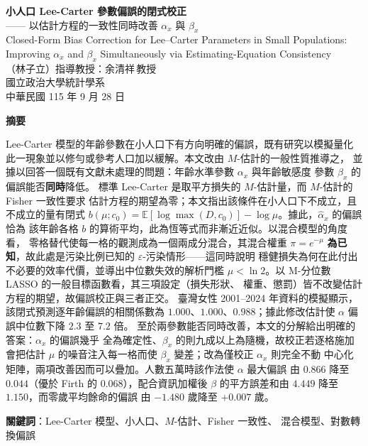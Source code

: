 \documentclass[UTF8, fontset=macnew, a4paper, 12pt]{ctexart}
\newcommand{\Ex}{\mathbb{E}}
\begin{document}
\begin{center}
{\bfseries 小人口 Lee-Carter 參數偏誤的閉式校正}\\[4pt]
{ —— 以估計方程的一致性同時改善 $\alpha_x$ 與 $\beta_x$}\\[6pt]
{ Closed-Form Bias Correction for Lee--Carter Parameters in Small
Populations:}\\[2pt]
{ Improving $\alpha_x$ and $\beta_x$ Simultaneously via
Estimating-Equation Consistency}\\[12pt]
{ （林子立）\quad 指導教授：余清祥\,教授}\\[4pt]
{ 國立政治大學統計學系}\\[4pt]
{ 中華民國 115 年 9 月 28 日}
\end{center}

\vspace{6pt}
\begin{center}
\begin{minipage}{0.92\textwidth}
\small
\textbf{摘要}\par\vspace{4pt}
Lee-Carter 模型的年齡參數在小人口下有方向明確的偏誤，既有研究以模擬量化
此一現象並以修勻或參考人口加以緩解。本文改由 $M$-估計的一般性質推導之，
並據以回答一個既有文獻未處理的問題：年齡水準參數 $\alpha_x$ 與年齡敏感度
參數 $\beta_x$ 的偏誤能否\textbf{同時}降低。
標準 Lee-Carter 是取平方損失的 $M$-估計量，而 $M$-估計的 Fisher 一致性要求
估計方程的期望為零；本文指出該條件在小人口下不成立，且不成立的量有閉式
$b(\mu;c_0)=\Ex[\log\max(D,c_0)]-\log\mu$。據此，$\hat\alpha_x$ 的偏誤恰為
該年齡各格 $b$ 的算術平均，此為恆等式而非漸近近似。以混合模型的角度看，
零格替代使每一格的觀測成為一個兩成分混合，其混合權重 $\pi=e^{-\mu}$
\textbf{為已知}，故此處是污染比例已知的 $\varepsilon$-污染情形——這同時說明
穩健損失為何在此付出不必要的效率代價，並導出中位數失效的解析門檻
$\mu<\ln 2$。以 M-分位數 LASSO 的一般目標函數看，其三項設定（損失形狀、
權重、懲罰）皆不改變估計方程的期望，故偏誤校正與三者正交。
臺灣女性 2001--2024 年資料的模擬顯示，該閉式預測逐年齡偏誤的相關係數為
$1.000$、$1.000$、$0.988$；據此修改估計使 $\alpha$ 偏誤中位數下降 $2.3$ 至 $7.2$ 倍。
至於兩參數能否同時改善，本文的分解給出明確的答案：$\alpha_x$ 的偏誤幾乎
全為確定性、$\beta_x$ 的則九成以上為隨機，故校正若逐格施加會把估計 $\mu$
的噪音注入每一格而使 $\beta_x$ 變差；改為僅校正 $\alpha_x$ 則完全不動
中心化矩陣，兩項改善因而可以疊加。人數五萬時該作法使 $\alpha$ 最大偏誤
由 $0.866$ 降至 $0.044$（優於 Firth 的 $0.068$），配合資訊加權後
$\beta$ 的平方誤差和由 $4.449$ 降至 $1.150$，而零歲平均餘命的偏誤
由 $-1.480$ 歲降至 $+0.007$ 歲。
\par\vspace{6pt}
\textbf{關鍵詞}：Lee-Carter 模型、小人口、$M$-估計、Fisher 一致性、
混合模型、對數轉換偏誤
\end{minipage}
\end{center}
\end{document}
